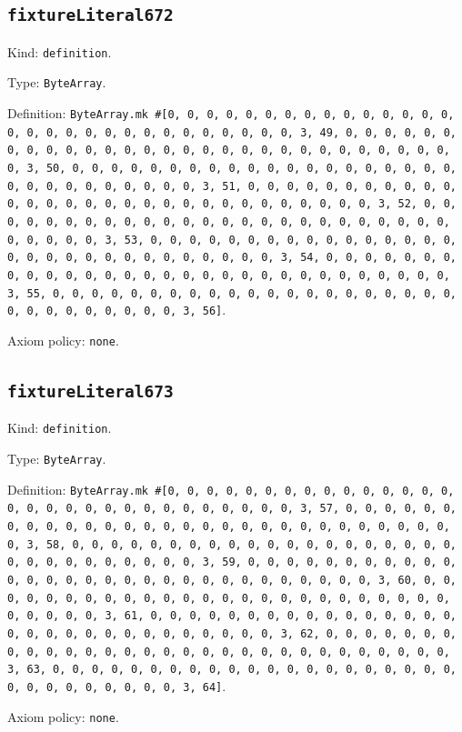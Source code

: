 \documentclass[11pt]{article}
\begin{document}
\subsection*{\texttt{fixtureLiteral672}}
\noindent Kind: \texttt{definition}.\par
\noindent Type: \texttt{ByteArray}.\par
\noindent Definition: \texttt{ByteArray.mk \#[0, 0, 0, 0, 0, 0, 0, 0, 0, 0, 0, 0, 0, 0, 0, 0, 0, 0, 0, 0, 0, 0, 0, 0, 0, 0, 0, 0, 0, 0, 3, 49, 0, 0, 0, 0, 0, 0, 0, 0, 0, 0, 0, 0, 0, 0, 0, 0, 0, 0, 0, 0, 0, 0, 0, 0, 0, 0, 0, 0, 0, 0, 3, 50, 0, 0, 0, 0, 0, 0, 0, 0, 0, 0, 0, 0, 0, 0, 0, 0, 0, 0, 0, 0, 0, 0, 0, 0, 0, 0, 0, 0, 0, 0, 3, 51, 0, 0, 0, 0, 0, 0, 0, 0, 0, 0, 0, 0, 0, 0, 0, 0, 0, 0, 0, 0, 0, 0, 0, 0, 0, 0, 0, 0, 0, 0, 3, 52, 0, 0, 0, 0, 0, 0, 0, 0, 0, 0, 0, 0, 0, 0, 0, 0, 0, 0, 0, 0, 0, 0, 0, 0, 0, 0, 0, 0, 0, 0, 3, 53, 0, 0, 0, 0, 0, 0, 0, 0, 0, 0, 0, 0, 0, 0, 0, 0, 0, 0, 0, 0, 0, 0, 0, 0, 0, 0, 0, 0, 0, 0, 3, 54, 0, 0, 0, 0, 0, 0, 0, 0, 0, 0, 0, 0, 0, 0, 0, 0, 0, 0, 0, 0, 0, 0, 0, 0, 0, 0, 0, 0, 0, 0, 3, 55, 0, 0, 0, 0, 0, 0, 0, 0, 0, 0, 0, 0, 0, 0, 0, 0, 0, 0, 0, 0, 0, 0, 0, 0, 0, 0, 0, 0, 0, 0, 3, 56]}.\par
\noindent Axiom policy: \texttt{none}.\par
\subsection*{\texttt{fixtureLiteral673}}
\noindent Kind: \texttt{definition}.\par
\noindent Type: \texttt{ByteArray}.\par
\noindent Definition: \texttt{ByteArray.mk \#[0, 0, 0, 0, 0, 0, 0, 0, 0, 0, 0, 0, 0, 0, 0, 0, 0, 0, 0, 0, 0, 0, 0, 0, 0, 0, 0, 0, 0, 0, 3, 57, 0, 0, 0, 0, 0, 0, 0, 0, 0, 0, 0, 0, 0, 0, 0, 0, 0, 0, 0, 0, 0, 0, 0, 0, 0, 0, 0, 0, 0, 0, 3, 58, 0, 0, 0, 0, 0, 0, 0, 0, 0, 0, 0, 0, 0, 0, 0, 0, 0, 0, 0, 0, 0, 0, 0, 0, 0, 0, 0, 0, 0, 0, 3, 59, 0, 0, 0, 0, 0, 0, 0, 0, 0, 0, 0, 0, 0, 0, 0, 0, 0, 0, 0, 0, 0, 0, 0, 0, 0, 0, 0, 0, 0, 0, 3, 60, 0, 0, 0, 0, 0, 0, 0, 0, 0, 0, 0, 0, 0, 0, 0, 0, 0, 0, 0, 0, 0, 0, 0, 0, 0, 0, 0, 0, 0, 0, 3, 61, 0, 0, 0, 0, 0, 0, 0, 0, 0, 0, 0, 0, 0, 0, 0, 0, 0, 0, 0, 0, 0, 0, 0, 0, 0, 0, 0, 0, 0, 0, 3, 62, 0, 0, 0, 0, 0, 0, 0, 0, 0, 0, 0, 0, 0, 0, 0, 0, 0, 0, 0, 0, 0, 0, 0, 0, 0, 0, 0, 0, 0, 0, 3, 63, 0, 0, 0, 0, 0, 0, 0, 0, 0, 0, 0, 0, 0, 0, 0, 0, 0, 0, 0, 0, 0, 0, 0, 0, 0, 0, 0, 0, 0, 0, 3, 64]}.\par
\noindent Axiom policy: \texttt{none}.\par
\end{document}
